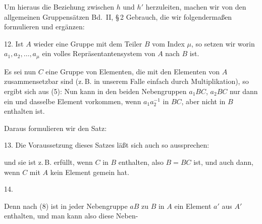 
Um hieraus die Beziehung zwischen $h$ und $h'$ herzuleiten, machen wir von den allgemeinen Gruppensätzen Bd.~II, \S\,2 Gebrauch, die wir folgendermaßen formulieren und ergänzen:

12. 
Ist $A$ wieder eine Gruppe mit dem Teiler $B$ vom Index $\mu$, so setzen wir
worin $a_1, a_2, \dots, a_\mu$ ein volles Repräsentantensystem von $A$ nach $B$ ist.

Es sei nun $C$ eine Gruppe von Elementen, die mit den Elementen von $A$ zusammensetzbar sind (z.\,B. in unserem Falle einfach durch Multiplikation), so ergibt sich aus (5):
Nun kann in den beiden Nebengruppen $a_1BC$, $a_2BC$ nur dann ein und dasselbe Element vorkommen, wenn $a_1a_2^{-1}$ in $BC$, aber nicht in $B$ enthalten ist.

Daraus formulieren wir den Satz:

13. 
Die Voraussetzung dieses Satzes läßt sich auch so aussprechen:

\begin{center}\end{center}

und sie ist z.\,B. erfüllt, wenn $C$ in $B$ enthalten, also $B = BC$ ist, und auch dann, wenn $C$ mit $A$ kein Element gemein hat.

14. 

Denn nach (8) ist in jeder Nebengruppe $aB$ zu $B$ in $A$ ein Element $a'$ aus $A'$ enthalten, und man kann also diese Neben-
